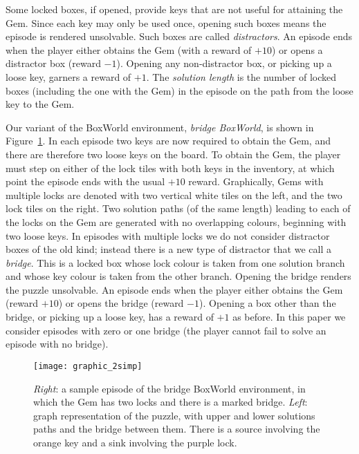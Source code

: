 \documentclass{article} %
\begin{document}
Some locked boxes, if opened, provide keys that are not useful for attaining the Gem. Since each key may only be used once, opening such boxes means the episode is rendered unsolvable. Such boxes are called \emph{distractors}. An episode ends when the player either obtains the Gem (with a reward of $+10$) or opens a distractor box (reward $-1$). Opening any non-distractor box, or picking up a loose key, garners a reward of $+1$. The \emph{solution length} is the number of locked boxes (including the one with the Gem) in the episode on the path from the loose key to the Gem. 

Our variant of the BoxWorld environment, \emph{bridge BoxWorld}, is shown in Figure~\ref{figure:multi_lock_first}. In each episode two keys are now required to obtain the Gem, and there are therefore two loose keys on the board. To obtain the Gem, the player must step on either of the lock tiles with both keys in the inventory, at which point the episode ends with the usual $+10$ reward. Graphically, Gems with multiple locks are denoted with two vertical white tiles on the left, and the two lock tiles on the right.  Two solution paths (of the same length) leading to each of the locks on the Gem are generated with no overlapping colours, beginning with two loose keys. In episodes with multiple locks we do not consider distractor boxes of the old kind; instead there is a new type of distractor that we call a \emph{bridge}. This is a locked box whose lock colour is taken from one solution branch and whose key colour is taken from the other branch. Opening the bridge renders the puzzle unsolvable. An episode ends when the player either obtains the Gem (reward $+10$) or opens the bridge (reward $-1$). Opening a box other than the bridge, or picking up a loose key, has a reward of $+1$ as before. In this paper we consider episodes with zero or one bridge (the player cannot fail to solve an episode with no bridge).

\begin{figure}[h]
\begin{center}
\texttt{[image: graphic\_2simp]}
\end{center}
\caption{\emph{Right}: a sample episode of the bridge BoxWorld environment, in which the Gem has two locks and there is a marked bridge. \emph{Left}: graph representation of the puzzle, with upper and lower solutions paths and the bridge between them. There is a source involving the orange key and a sink involving the purple lock.}
\label{figure:multi_lock_first}
\end{figure}
\end{document}
